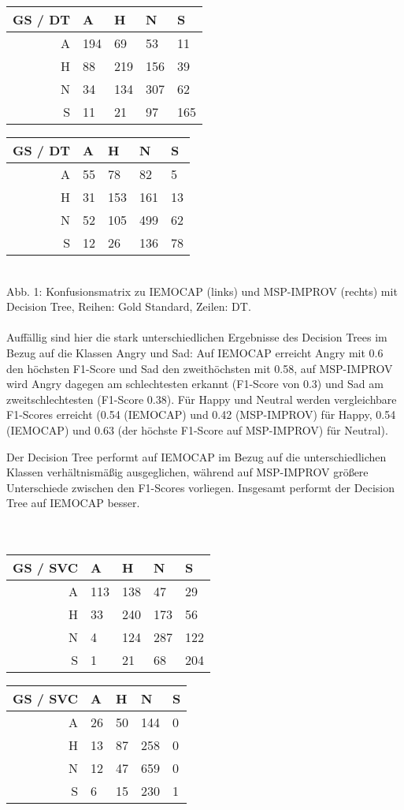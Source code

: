 \documentclass{article} %
\begin{document}
\begin{tabular}{|r|llll|}
\hline
GS / DT & A & H & N & S \\
\hline
A & 194 & 69 & 53 & 11 \\
H & 88 & 219 & 156 & 39 \\
N & 34 & 134 & 307 & 62 \\
S & 11 & 21 & 97 & 165 \\
\hline
\end{tabular}
\begin{tabular}{|r|llll|}
\hline
GS / DT & A & H & N & S \\
\hline
A & 55 & 78 & 82 & 5 \\
H & 31 & 153 & 161 & 13 \\
N & 52 & 105 & 499 & 62 \\
S & 12 & 26 & 136 & 78 \\
\hline
\end{tabular} \\

Abb. 1: Konfusionsmatrix zu IEMOCAP (links) und MSP-IMPROV (rechts) mit Decision Tree, Reihen: Gold Standard, Zeilen: DT. \\ \\
Auffällig sind hier die stark unterschiedlichen Ergebnisse des Decision Trees im Bezug auf die Klassen Angry und Sad: Auf IEMOCAP erreicht Angry mit 0.6 den höchsten F1-Score und Sad den zweithöchsten mit 0.58, auf MSP-IMPROV wird Angry dagegen am schlechtesten erkannt (F1-Score von 0.3) und Sad am zweitschlechtesten (F1-Score 0.38). Für Happy und Neutral werden vergleichbare F1-Scores erreicht (0.54 (IEMOCAP) und 0.42 (MSP-IMPROV) für Happy, 0.54 (IEMOCAP) und 0.63 (der höchste F1-Score auf MSP-IMPROV) für Neutral). 

Der Decision Tree performt auf IEMOCAP im Bezug auf die unterschiedlichen Klassen verhältnismäßig ausgeglichen, während auf MSP-IMPROV größere Unterschiede zwischen den F1-Scores vorliegen. Insgesamt performt der Decision Tree auf IEMOCAP besser. \\ \\ \\
\begin{tabular}{|r|llll|}
\hline
GS / SVC & A & H & N & S \\
\hline
A & 113 & 138 & 47 & 29 \\
H & 33 & 240 & 173 & 56 \\
N & 4 & 124 & 287 & 122 \\
S & 1 & 21 & 68 & 204 \\
\hline
\end{tabular} 
\begin{tabular}{|r|llll|}
\hline
GS / SVC & A & H & N & S \\
\hline
A & 26 & 50 & 144 & 0 \\
H & 13 & 87 & 258 & 0 \\
N & 12 & 47 & 659 & 0 \\
S & 6 & 15 & 230 & 1 \\
\hline
\end{tabular} \\
\end{document}
